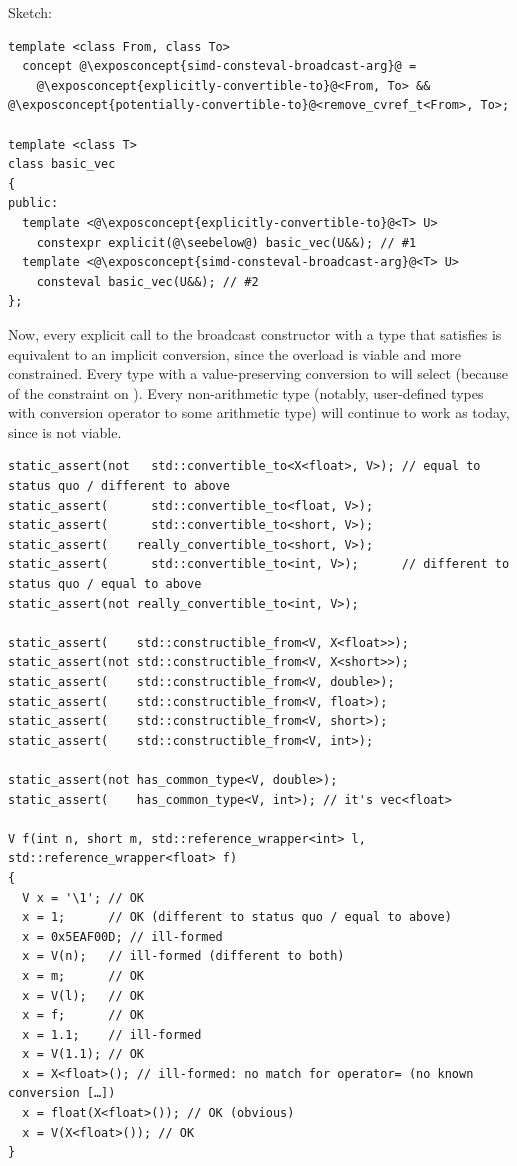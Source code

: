 Sketch:
\medskip\begin{lstlisting}[style=Vc]
template <class From, class To>
  concept @\exposconcept{simd-consteval-broadcast-arg}@ =
    @\exposconcept{explicitly-convertible-to}@<From, To> && @\exposconcept{potentially-convertible-to}@<remove_cvref_t<From>, To>;

template <class T>
class basic_vec
{
public:
  template <@\exposconcept{explicitly-convertible-to}@<T> U>
    constexpr explicit(@\seebelow@) basic_vec(U&&); // #1
  template <@\exposconcept{simd-consteval-broadcast-arg}@<T> U>
    consteval basic_vec(U&&); // #2
};
\end{lstlisting}

Now, every explicit call to the broadcast constructor with a type  that satisfies
 is equivalent to an implicit conversion, since the
 overload is viable and more constrained.
Every type with a value-preserving conversion to  will select  (because of the
constraint on ).
Every non-arithmetic type (notably, user-defined types with conversion operator to some arithmetic
type) will continue to work as today, since  is not viable.

\bigskip
\begin{lstlisting}[style=Vc]
static_assert(not   std::convertible_to<X<float>, V>); // equal to status quo / different to above
static_assert(      std::convertible_to<float, V>);
static_assert(      std::convertible_to<short, V>);
static_assert(    really_convertible_to<short, V>);
static_assert(      std::convertible_to<int, V>);      // different to status quo / equal to above
static_assert(not really_convertible_to<int, V>);

static_assert(    std::constructible_from<V, X<float>>);
static_assert(not std::constructible_from<V, X<short>>);
static_assert(    std::constructible_from<V, double>);
static_assert(    std::constructible_from<V, float>);
static_assert(    std::constructible_from<V, short>);
static_assert(    std::constructible_from<V, int>);

static_assert(not has_common_type<V, double>);
static_assert(    has_common_type<V, int>); // it's vec<float>

V f(int n, short m, std::reference_wrapper<int> l, std::reference_wrapper<float> f)
{
  V x = '\1'; // OK
  x = 1;      // OK (different to status quo / equal to above)
  x = 0x5EAF00D; // ill-formed
  x = V(n);   // ill-formed (different to both)
  x = m;      // OK
  x = V(l);   // OK
  x = f;      // OK
  x = 1.1;    // ill-formed
  x = V(1.1); // OK
  x = X<float>(); // ill-formed: no match for operator= (no known conversion […])
  x = float(X<float>()); // OK (obvious)
  x = V(X<float>()); // OK
}
\end{lstlisting}


